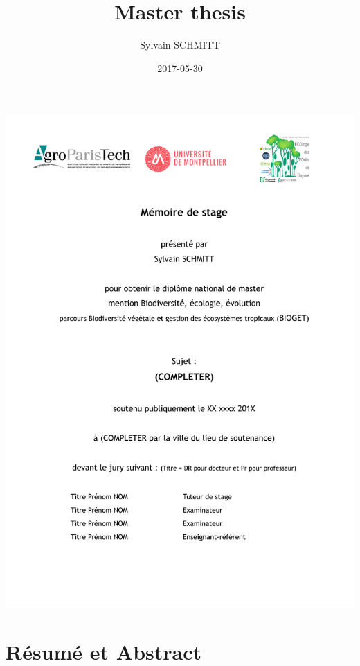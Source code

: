 \documentclass[]{article}
\title{Master thesis}
\author{Sylvain SCHMITT}
\date{2017-05-30}
\begin{document}
\maketitle

\date{}

\thispagestyle{empty}
\begin{center}
\includegraphics{images/main.pdf}
\end{center}

\setlength{\abovedisplayskip}{-5pt}
\setlength{\abovedisplayshortskip}{-5pt}

{
\hypersetup{linkcolor=black}
\setcounter{tocdepth}{2}
\tableofcontents
}
\section*{Résumé et Abstract}\label{resume-et-abstract}
\end{document}
